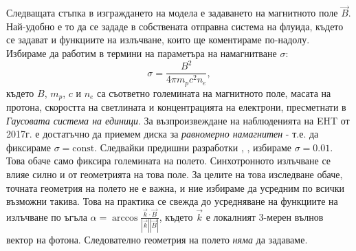 Следващата стъпка в изграждането на модела е задаването на магнитното поле $\vec{B}$. Най-удобно е то да се зададе в собствената отправна система на флуида, където се задават и функциите на излъчване, които ще коментираме по-надолу. Избираме да работим в термини на параметъра на намагнитване $\sigma$:
\begin{equation}
	\sigma = \frac{B^2}{4\pi m_pc^2n_e},
\end{equation}
където $B$, $m_p$, $c$ и $n_e$ са съответно големината на магнитното поле, масата на протона, скоростта на светлината и концентрацията на електрони, пресметнати в \emph{Гаусовата система на единици}. За възпроизвеждане на наблюденията на EHT от 2017г. е достатъчно да приемем диска за \emph{равномерно намагнитен} - т.е. да фиксираме $\sigma = \text{const}$. Следвайки предишни разработки \cite{KERR_SIM_PAPER}, \cite{Geometric_Modeling}, избираме $\sigma = 0.01$. Това обаче само фиксира големината на полето. Синхотронното излъчване се влияе силно и от геометрията на това поле. За целите на това изследване обаче, точната геометрия на полето не е важна, и ние избираме да усредним по всички възможни такива. Това на практика се свежда до усредняване на функциите на излъчване по ъгъла $\alpha = \arccos\frac{\vec{k}\cdot\vec{B}}{|\vec{k}||\vec{B}|}$, където $\vec{k}$ е локалният 3-мерен вълнов вектор на фотона. Следователно геометрия на полето \emph{няма} да задаваме.\\

